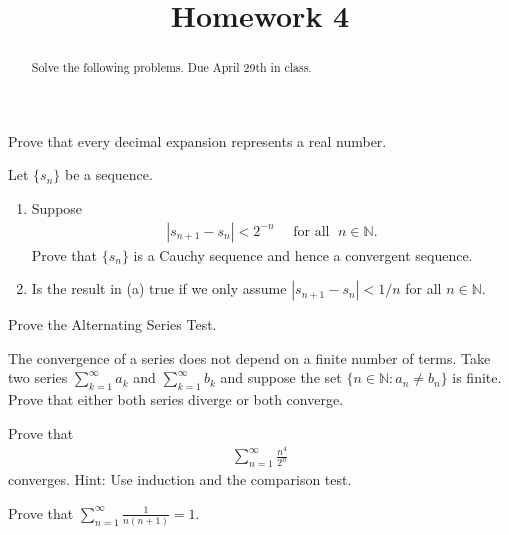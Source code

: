 \documentclass{ximera}
\begin{document}
    \title{Homework 4}
    \begin{abstract} Solve the following problems.  Due April 29th in class. \end{abstract}
    \maketitle

\begin{exercise}
    Prove that every decimal expansion represents a real number.
\end{exercise}

\begin{exercise}
Let $\{s_n\}$ be a sequence.
    \begin{enumerate}
        \item Suppose 
        \begin{align*}
            |s_{n+1} - s_n| < 2^{-n} \quad \text{ for all } \;  n \in \mathbb{N}.
        \end{align*}
        Prove that $\{s_n\}$ is a Cauchy sequence and hence a convergent sequence.
        \item Is the result in (a) true if we only assume $|s_{n+1} - s_n| < 1/n$ for all $n \in \mathbb{N}$.
    \end{enumerate}
\end{exercise}

\begin{exercise}
Prove the Alternating Series Test.
\end{exercise}

\begin{exercise}
    The convergence of a series does not depend on a finite number of terms.  Take two series $\sum\limits_{k=1}^\infty a_k$ and $\sum\limits_{k=1}^\infty b_k$ and suppose the set $\{n\in \mathbb{N}: a_n \neq b_n\}$ is finite.  Prove that either both series diverge or both converge.
\end{exercise}

\begin{exercise}
    Prove that 
    \begin{align}
    \sum\limits_{n=1}^\infty \frac{n^4}{2^n}
    \end{align}
    converges.  Hint: Use induction and the comparison test.
\end{exercise}

\begin{exercise}
    Prove that $\sum\limits_{n=1}^\infty \frac{1}{n(n+1)} = 1$.
\end{exercise}
\end{document}
